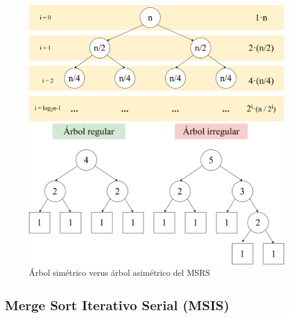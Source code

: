 \documentclass[titlepage]{article}
\begin{document}
\begin{figure}[h]
\centering 
\captionsetup{justification=centering, margin=10pt}
\begin{minipage}{0.5\textwidth} 
    \centering 
    \includegraphics[width=0.95\linewidth]{Diagrames/arbolBinarioLenght.png} 
    \caption{Tamaño de la entrada a lo largo de las llamadas a \lstinline{sort()}} 
    \label{fig:entradaMSRS}
\end{minipage}\hfill 
\begin{minipage}{0.5\textwidth} 
    \centering 
    \includegraphics[width=0.95\linewidth]{Diagrames/arbolBinario_MSRS.png} 
    \caption{Árbol simétrico verus árbol asimétrico del MSRS} 
    \label{fig:simetriaMSRS}
\end{minipage} \end{figure}

\subsection{Merge Sort Iterativo Serial (MSIS)}
\end{document}
